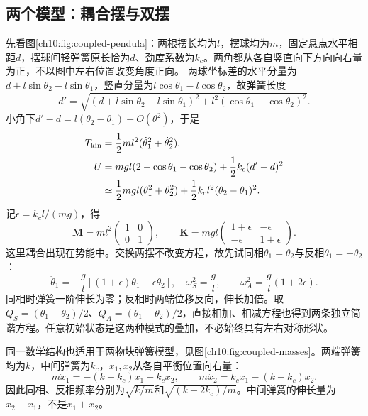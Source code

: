 \subsection{两个模型：耦合摆与双摆}
先看图\ref{ch10:fig:coupled-pendula}：两根摆长均为$l$，摆球均为$m$，固定悬点水平相距$d$，摆球间轻弹簧原长恰为$d$、劲度系数为$k_c$。两角都从各自竖直向下方向向右量为正，不以图中左右位置改变角度正向。
\chTenCoupledPendulaFigure
两球坐标差的水平分量为$d+l\sin\theta_2-l\sin\theta_1$，竖直分量为$l\cos\theta_1-l\cos\theta_2$，故弹簧长度
\[
 d'=\sqrt{(d+l\sin\theta_2-l\sin\theta_1)^2+
 l^2(\cos\theta_1-\cos\theta_2)^2}.
\]
小角下$d'-d=l(\theta_2-\theta_1)+O(\theta^2)$，于是
\begin{align*}
 T_{\rm kin}&=\frac12ml^2(\dot\theta_1^2+\dot\theta_2^2),\\
 U&=mgl(2-\cos\theta_1-\cos\theta_2)+\frac12k_c(d'-d)^2\\
 &\simeq\frac12mgl(\theta_1^2+\theta_2^2)
 +\frac12k_cl^2(\theta_2-\theta_1)^2.
\end{align*}
记$\epsilon=k_cl/(mg)$，得
\[
 \mathbf M=ml^2\begin{pmatrix}1&0\\0&1\end{pmatrix},\qquad
 \mathbf K=mgl\begin{pmatrix}1+\epsilon&-\epsilon\\-\epsilon&1+\epsilon\end{pmatrix}.
\]
这里耦合出现在势能中。交换两摆不改变方程，故先试同相$\theta_1=\theta_2$与反相$\theta_1=-\theta_2$：
\[
 \ddot\theta_1=-\frac gl[(1+\epsilon)\theta_1-\epsilon\theta_2],
 \quad\omega_S^2=\frac gl,
 \qquad\omega_A^2=\frac gl(1+2\epsilon).
\]
同相时弹簧一阶伸长为零；反相时两端位移反向，伸长加倍。取$Q_S=(\theta_1+\theta_2)/2$、$Q_A=(\theta_1-\theta_2)/2$，直接相加、相减方程也得到两条独立简谐方程。任意初始状态是这两种模式的叠加，不必始终具有左右对称形状。

同一数学结构也适用于两物块弹簧模型，见图\ref{ch10:fig:coupled-masses}。两端弹簧均为$k$，中间弹簧为$k_c$，$x_1,x_2$从各自平衡位置向右量：
\[
 m\ddot x_1=-(k+k_c)x_1+k_cx_2,\qquad
 m\ddot x_2=k_cx_1-(k+k_c)x_2.
\]
因此同相、反相频率分别为$\sqrt{k/m}$和$\sqrt{(k+2k_c)/m}$。中间弹簧的伸长量为$x_2-x_1$，不是$x_1+x_2$。
\chTenCoupledMassFigure

